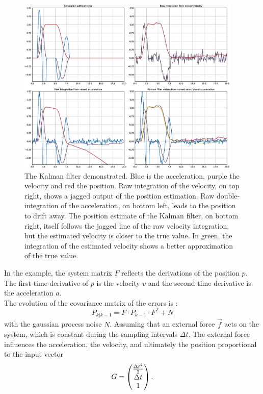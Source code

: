 \begin{figure}[H]
    \centering
    \includegraphics[width=0.95\textwidth]{images/Kalman_example_1d.eps}
    \caption{The Kalman filter demonstrated. Blue is the acceleration, purple the velocity and red the position. Raw integration of the velocity, on top right, shows a jagged output of the position estimation. Raw double-integration of the acceleration, on bottom left, leads to the position to drift away. The position estimate of the Kalman filter, on bottom right, itself follows the jagged line of the raw velocity integration, but the estimated velocity is closer to the true value. In green, the integration of the estimated velocity shows a better approximation of the true value.}
    \label{im:KalmanFilter1D}
\end{figure}
In the example, the system matrix $F$ reflects the derivations of the position $p$. The first time-derivative of $p$ is the velocity $v$ and the second time-derivative is the acceleration $a$.\\
The evolution of the covariance matrix of the errors is :
\begin{equation*}
    P_{k|k-1} = 
    F
    \cdot
    P_{k-1}
    \cdot
    F^{T}
    +
    N
\end{equation*}
with the gaussian process noise $N$. Assuming that an external force $\vec{f}$ acts on the system, which is constant during the sampling intervals $\Delta t$. The external force influences the acceleration, the velocity, and ultimately the position proportional to the input vector
\begin{equation*}
     G = 
\begin{pmatrix}
    \frac{\Delta t^{2}}{2}  \\
    \Delta t  \\
    1 
\end{pmatrix}.\\ 
\end{equation*}
